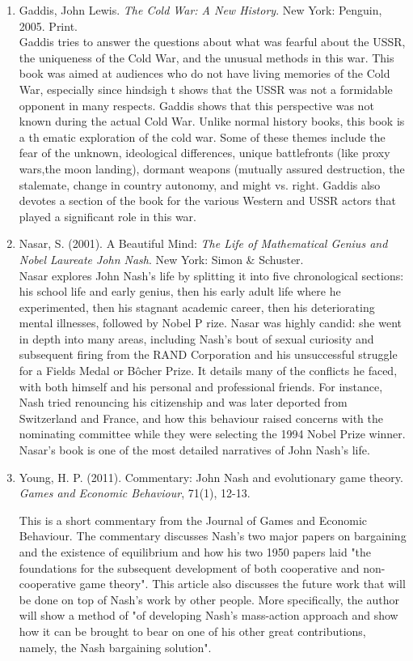 \documentclass[11pt]{article}
\begin{document}
\begin{enumerate}
\item Gaddis, John Lewis.  \textit{The Cold War: A New History}. New York: Penguin, 2005. Print.\\
 
Gaddis tries to answer the questions about what was fearful about the USSR, the uniqueness of the Cold War, and the unusual methods in this war. This book was aimed at audiences who do not have living memories of the Cold War, especially since hindsigh
t shows that the USSR was not a formidable opponent in many respects. Gaddis shows that this perspective was not known during the actual Cold War. Unlike normal history books, this book is a th
ematic exploration of the cold war. Some of these themes include the fear of the unknown, ideological differences, unique battlefronts (like proxy wars,the moon landing), dormant weapons (mutually assured destruction, the stalemate, change in country 
autonomy, and might vs. right. Gaddis also devotes a section of the book for the various Western and USSR actors that played a significant role in this war.\\

\item Nasar, S. (2001). A Beautiful Mind: \textit{The Life of Mathematical Genius and Nobel Laureate John Nash}. New York: Simon \& Schuster.\\

Nasar explores John Nash’s life by splitting it into five chronological sections: his school life and early genius, then his early adult life where he experimented, then his stagnant academic career, then his deteriorating mental illnesses, followed by Nobel P
rize.  Nasar was highly candid: she went in depth into many areas, including Nash’s bout of sexual curiosity and subsequent firing from the RAND Corporation and his unsuccessful struggle for a Fields Medal or Bôcher Prize. It details many of the conflicts he 
faced, with both himself and his personal and professional
 friends. For instance, Nash tried renouncing his citizenship and was later deported from Switzerland and France, and how this behaviour raised concerns with the nominating committee while they were selecting the 1994 Nobel Prize winner. Nasar’s book is one of the most detailed narratives of John Nash’s life.\\ 

\item Young, H. P. (2011). Commentary: John Nash and evolutionary game theory. \textit{Games and Economic Behaviour}, 71(1), 12-13.

This is a short commentary from the Journal of Games and Economic Behaviour. The commentary discusses Nash's two major papers on bargaining and the existence of equilibrium and how his two 1950 papers laid "the foundations for the subsequent development of both cooperative and non-cooperative game theory". This article also discusses the future work that will be done on top of Nash's work by other people. More specifically, the author will show a method of "of developing Nash's mass-action approach and show how it can be brought to bear on one of his other great contributions, namely, the Nash bargaining solution".
\end{enumerate}
\end{document}
